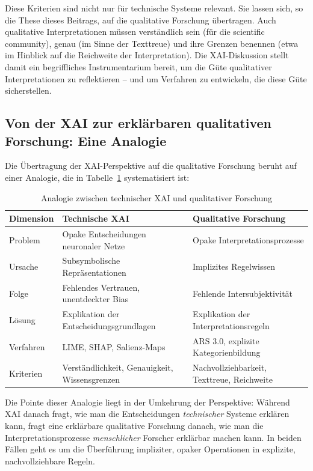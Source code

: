 \documentclass[
  12pt,
  a4paper,
  oneside,
  titlepage
]{article}
\begin{document}
Diese Kriterien sind nicht nur für technische Systeme relevant. Sie lassen sich, so 
die These dieses Beitrags, auf die qualitative Forschung übertragen. Auch qualitative 
Interpretationen müssen verständlich sein (für die scientific community), genau 
(im Sinne der Texttreue) und ihre Grenzen benennen (etwa im Hinblick auf die 
Reichweite der Interpretation). Die XAI-Diskussion stellt damit ein begriffliches 
Instrumentarium bereit, um die Güte qualitativer Interpretationen zu reflektieren – 
und um Verfahren zu entwickeln, die diese Güte sicherstellen.

\subsection{Von der XAI zur erklärbaren qualitativen Forschung: Eine Analogie}

Die Übertragung der XAI-Perspektive auf die qualitative Forschung beruht auf einer 
Analogie, die in Tabelle~\ref{tab:analogie} systematisiert ist:

\begin{table}[h]
\centering
\caption{Analogie zwischen technischer XAI und qualitativer Forschung}
\label{tab:analogie}
\begin{tabular}{@{} p{2.5cm} p{5cm} p{5cm} @{}}
\toprule
\textbf{Dimension} & \textbf{Technische XAI} & \textbf{Qualitative Forschung} \\
\midrule
Problem & Opake Entscheidungen neuronaler Netze & Opake Interpretationsprozesse \\
Ursache & Subsymbolische Repräsentationen & Implizites Regelwissen \\
Folge & Fehlendes Vertrauen, unentdeckter Bias & Fehlende Intersubjektivität \\
Lösung & Explikation der Entscheidungsgrundlagen & Explikation der Interpretationsregeln \\
Verfahren & LIME, SHAP, Salienz-Maps & ARS 3.0, explizite Kategorienbildung \\
Kriterien & Verständlichkeit, Genauigkeit, Wissensgrenzen & Nachvollziehbarkeit, Texttreue, Reichweite \\
\bottomrule
\end{tabular}
\end{table}

Die Pointe dieser Analogie liegt in der Umkehrung der Perspektive: Während XAI danach 
fragt, wie man die Entscheidungen \textit{technischer} Systeme erklären kann, fragt 
eine erklärbare qualitative Forschung danach, wie man die Interpretationsprozesse 
\textit{menschlicher} Forscher erklärbar machen kann. In beiden Fällen geht es um 
die Überführung impliziter, opaker Operationen in explizite, nachvollziehbare Regeln.
\end{document}
